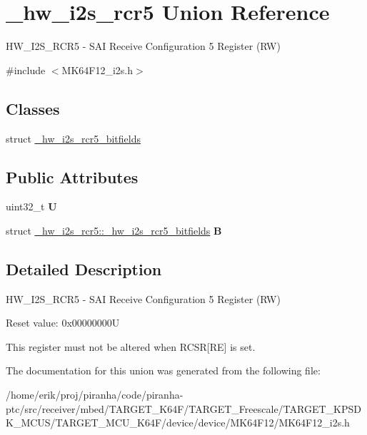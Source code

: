 \hypertarget{union__hw__i2s__rcr5}{}\section{\+\_\+hw\+\_\+i2s\+\_\+rcr5 Union Reference}
\label{union__hw__i2s__rcr5}


H\+W\+\_\+\+I2\+S\+\_\+\+R\+C\+R5 -\/ S\+AI Receive Configuration 5 Register (RW)  




{\ttfamily \#include $<$M\+K64\+F12\+\_\+i2s.\+h$>$}

\subsection*{Classes}
\begin{DoxyCompactItemize}
\item 
struct \hyperlink{struct__hw__i2s__rcr5_1_1__hw__i2s__rcr5__bitfields}{\+\_\+hw\+\_\+i2s\+\_\+rcr5\+\_\+bitfields}
\end{DoxyCompactItemize}
\subsection*{Public Attributes}
\begin{DoxyCompactItemize}
\item 
uint32\+\_\+t {\bfseries U}\hypertarget{union__hw__i2s__rcr5_a931d837c21b198cf786c281bea3fc9c7}{}\label{union__hw__i2s__rcr5_a931d837c21b198cf786c281bea3fc9c7}

\item 
struct \hyperlink{struct__hw__i2s__rcr5_1_1__hw__i2s__rcr5__bitfields}{\+\_\+hw\+\_\+i2s\+\_\+rcr5\+::\+\_\+hw\+\_\+i2s\+\_\+rcr5\+\_\+bitfields} {\bfseries B}\hypertarget{union__hw__i2s__rcr5_a0eb4ceaf1f4e5c5769d9b4e50be8a0a0}{}\label{union__hw__i2s__rcr5_a0eb4ceaf1f4e5c5769d9b4e50be8a0a0}

\end{DoxyCompactItemize}


\subsection{Detailed Description}
H\+W\+\_\+\+I2\+S\+\_\+\+R\+C\+R5 -\/ S\+AI Receive Configuration 5 Register (RW) 

Reset value\+: 0x00000000U

This register must not be altered when R\+C\+SR\mbox{[}RE\mbox{]} is set. 

The documentation for this union was generated from the following file\+:\begin{DoxyCompactItemize}
\item 
/home/erik/proj/piranha/code/piranha-\/ptc/src/receiver/mbed/\+T\+A\+R\+G\+E\+T\+\_\+\+K64\+F/\+T\+A\+R\+G\+E\+T\+\_\+\+Freescale/\+T\+A\+R\+G\+E\+T\+\_\+\+K\+P\+S\+D\+K\+\_\+\+M\+C\+U\+S/\+T\+A\+R\+G\+E\+T\+\_\+\+M\+C\+U\+\_\+\+K64\+F/device/device/\+M\+K64\+F12/M\+K64\+F12\+\_\+i2s.\+h\end{DoxyCompactItemize}
